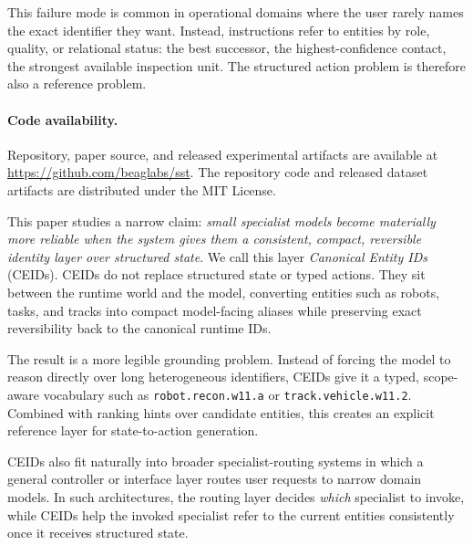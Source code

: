 \documentclass[11pt]{article}
\begin{document}
This failure mode is common in operational domains where the user rarely names the exact identifier they want. Instead, instructions refer to entities by role, quality, or relational status: the best successor, the highest-confidence contact, the strongest available inspection unit. The structured action problem is therefore also a reference problem.

\paragraph{Code availability.}
Repository, paper source, and released experimental artifacts are available at \url{https://github.com/beaglabs/sst}. The repository code and released dataset artifacts are distributed under the MIT License.

This paper studies a narrow claim: \emph{small specialist models become materially more reliable when the system gives them a consistent, compact, reversible identity layer over structured state}. We call this layer \emph{Canonical Entity IDs} (CEIDs). CEIDs do not replace structured state or typed actions. They sit between the runtime world and the model, converting entities such as robots, tasks, and tracks into compact model-facing aliases while preserving exact reversibility back to the canonical runtime IDs.

The result is a more legible grounding problem. Instead of forcing the model to reason directly over long heterogeneous identifiers, CEIDs give it a typed, scope-aware vocabulary such as \texttt{robot.recon.w11.a} or \texttt{track.vehicle.w11.2}. Combined with ranking hints over candidate entities, this creates an explicit reference layer for state-to-action generation.

CEIDs also fit naturally into broader specialist-routing systems in which a general controller or interface layer routes user requests to narrow domain models. In such architectures, the routing layer decides \emph{which} specialist to invoke, while CEIDs help the invoked specialist refer to the current entities consistently once it receives structured state.
\end{document}
